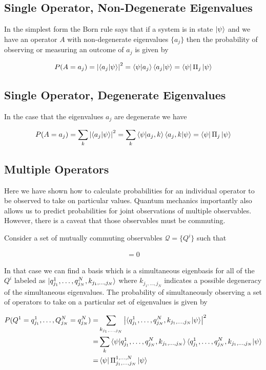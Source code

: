\documentclass[12pt]{article}
\begin{document}
\subsection{Single Operator, Non-Degenerate Eigenvalues}
In the simplest form the Born rule says that if a system is in state $\ket{\psi}$ and we have an operator $A$ with non-degenerate eigenvalues $\{a_j\}$ then the probability of observing or measuring an outcome of $a_j$ is given by

\begin{align}
P(A = a_j) = \left|\braket{a_j|\psi}\right|^2 = \braket{\psi|a_j}\braket{a_j|\psi} = \bra{\psi}\Pi_j \ket{\psi}
\end{align}

\subsection{Single Operator, Degenerate Eigenvalues}
In the case that the eigenvalues $a_j$ are degenerate we have

\begin{align}
P(A = a_j) = \sum_k \left|\braket{a_j|\psi}\right|^2 = \sum_k \braket{\psi|a_j, k}\braket{a_j, k|\psi} = \bra{\psi}\Pi_j \ket{\psi}
\end{align}

\subsection{Multiple Operators}
Here we have shown how to calculate probabilities for an individual operator to be observed to take on particular values.
Quantum mechanics importantly also allows us to predict probabilities for joint observations of multiple observables.
However, there is a caveat that those observables must be commuting.

Consider a set of mutually commuting observables $\mathcal{Q} = \{Q^i\}$ such that

\begin{align}
[Q^i, Q^j] = 0
\end{align}

In that case we can find a basis which is a simultaneous eigenbasis for all of the $Q^i$ labeled as $\ket{q^1_{j_1}, \ldots, q^N_{j_N}, k_{j_1,\ldots, j_N}}$ where $k_{j_1,\ldots,j_N}$ indicates a possible degeneracy of the simultaneous eigenvalues.
The probability of simultaneously observing a set of operators to take on a particular set of eigenvalues is given by

\begin{align}
P(Q^1=q^1_{j_1}, \ldots, Q^N_{j_N} = q^N_{j_N}) =& \sum_{k_{j_1,\ldots,j_N}} \left|\braket{q^1_{j_1}, \ldots, q^N_{j_N}, k_{j_1,\ldots,j_N} | \psi}\right|^2 \nonumber\\
=&\sum_k \braket{\psi | q^1_{j_1}, \ldots, q^N_{j_N}, k_{j_1,\ldots,j_N}}\braket{q^1_{j_1}, \ldots, q^N_{j_N}, k_{j_1,\ldots,j_N} | \psi} \nonumber\\
=& \bra{\psi}\Pi^{1,\ldots, N}_{j_1,\ldots,j_N}\ket{\psi}
\end{align}
\end{document}
